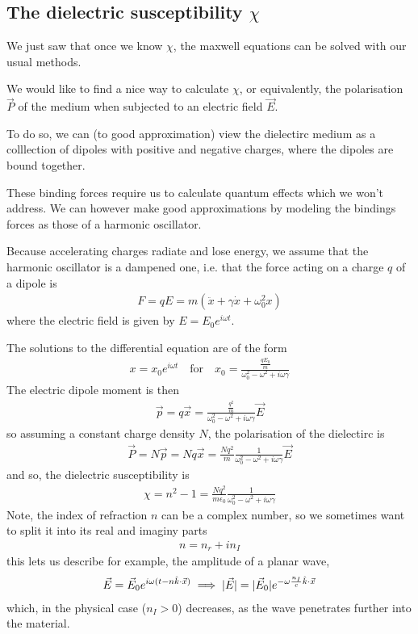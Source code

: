 \subsection{The dielectric susceptibility $\chi$}
We just saw that once we know $\chi$, the maxwell equations can be solved with our usual methods.

We would like to find a nice way to calculate $\chi$, or equivalently, the polarisation $\vec{P}$ of the medium when subjected to an electric field $\vec{E}$.

To do so, we can (to good approximation) view the dielectirc medium as a colllection of dipoles with positive and negative charges, where the dipoles are bound together.

These binding forces require us to calculate quantum effects which we won't address.
We can however make good approximations by modeling the bindings forces as those of a harmonic oscillator.

Because accelerating charges radiate and lose energy, we assume that the harmonic oscillator is a dampened one, i.e. that the force acting on a charge $q$ of a dipole is
\begin{align*}
  F = qE = m(\ddot{x} + \gamma \dot{x} + \omega_0^{2} x)
\end{align*}
where the electric field is given by $E = E_0 e^{i \omega t}$.

The solutions to the differential equation are of the form
\begin{align*}
  x = x_0 e^{i \omega t} \quad \text{for} \quad x_0 = \frac{\frac{qE_0}{m}}{\omega_0^{2} - \omega^{2} + i \omega \gamma}
\end{align*}
The electric dipole moment is then
\begin{align*}
  \vec{p} = q \vec{x} = \frac{\frac{q^{2}}{m}}{\omega_0^{2} - \omega^{2} + i \omega \gamma} \vec{E}
\end{align*}
so assuming a constant charge density $N$, the polarisation of the dielectirc is
\begin{align*}
  \vec{P} = N \vec{p} = N q \vec{x} = \frac{Nq^{2}}{m} \frac{1}{\omega_0^{2} - \omega^{2} + i \omega \gamma}\vec{E}
\end{align*}
and so, the dielectric susceptibility is
\begin{align*}
  \chi = n^{2} - 1 = \frac{N q^{2}}{m \epsilon_0} \frac{1}{\omega_0^{2} - \omega^{2} + i \omega \gamma}
\end{align*}
Note, the index of refraction $n$ can be a complex number, so we sometimes want to split it into its real and imaginy parts
\begin{align*}
  n = n_r + i n_I
\end{align*}
this lets us describe for example, the amplitude of a planar wave,
\begin{align*}
  \vec{E} = \vec{E}_0 e^{i \omega (t - n \hat{k} \cdot \vec{x})} \implies \vert\vec{E}\vert = \vert\vec{E}_0\vert e^{- \omega \frac{n_I}{c} \hat{k} \cdot \vec{x}}
\end{align*}
which, in the physical case ($n_I > 0$) decreases, as the wave penetrates further into the material.
